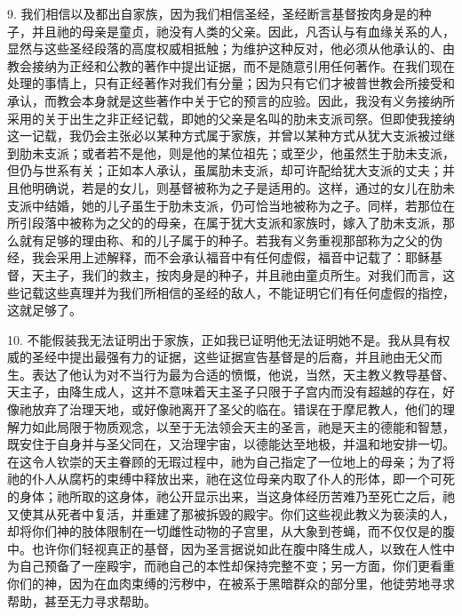 9. 我们相信以及都出自家族，因为我们相信圣经，圣经断言基督按肉身是的种子，并且祂的母亲是童贞，祂没有人类的父亲。因此，凡否认与有血缘关系的人，显然与这些圣经段落的高度权威相抵触；为维护这种反对，他必须从他承认的、由教会接纳为正经和公教的著作中提出证据，而不是随意引用任何著作。在我们现在处理的事情上，只有正经著作对我们有分量；因为只有它们才被普世教会所接受和承认，而教会本身就是这些著作中关于它的预言的应验。因此，我没有义务接纳所采用的关于出生之非正经记载，即她的父亲是名叫的肋未支派司祭。但即使我接纳这一记载，我仍会主张必以某种方式属于家族，并曾以某种方式从犹大支派被过继到肋未支派；或者若不是他，则是他的某位祖先；或至少，他虽然生于肋未支派，但仍与世系有关；正如本人承认，虽属肋未支派，却可许配给犹大支派的丈夫；并且他明确说，若是的女儿，则基督被称为之子是适用的。这样，通过的女儿在肋未支派中结婚，她的儿子虽生于肋未支派，仍可恰当地被称为之子。同样，若那位在所引段落中被称为之父的的母亲，在属于犹大支派和家族时，嫁入了肋未支派，那么就有足够的理由称、和的儿子属于的种子。若我有义务重视那部称为之父的伪经，我会采用上述解释，而不会承认福音中有任何虚假，福音中记载了：耶稣基督，天主子，我们的救主，按肉身是的种子，并且祂由童贞所生。对我们而言，这些记载这些真理并为我们所相信的圣经的敌人，不能证明它们有任何虚假的指控，这就足够了。\par

10. 不能假装我无法证明出于家族，正如我已证明他无法证明她不是。我从具有权威的圣经中提出最强有力的证据，这些证据宣告基督是的后裔，并且祂由无父而生。表达了他认为对不当行为最为合适的愤慨，他说，当然，天主教义教导基督、天主子，由降生成人，这并不意味着天主圣子只限于子宫内而没有超越的存在，好像祂放弃了治理天地，或好像祂离开了圣父的临在。错误在于摩尼教人，他们的理解力如此局限于物质观念，以至于无法领会天主的圣言，祂是天主的德能和智慧，既安住于自身并与圣父同在，又治理宇宙，以德能达至地极，并温和地安排一切。在这令人钦崇的天主眷顾的无瑕过程中，祂为自己指定了一位地上的母亲；为了将祂的仆人从腐朽的束缚中释放出来，祂在这位母亲内取了仆人的形体，即一个可死的身体；祂所取的这身体，祂公开显示出来，当这身体经历苦难乃至死亡之后，祂又使其从死者中复活，并重建了那被拆毁的殿宇。你们这些视此教义为亵渎的人，却将你们神的肢体限制在一切雌性动物的子宫里，从大象到苍蝇，而不仅仅是的腹中。也许你们轻视真正的基督，因为圣言据说如此在腹中降生成人，以致在人性中为自己预备了一座殿宇，而祂自己的本性却保持完整不变；另一方面，你们更看重你们的神，因为在血肉束缚的污秽中，在被系于黑暗群众的部分里，他徒劳地寻求帮助，甚至无力寻求帮助。\par


